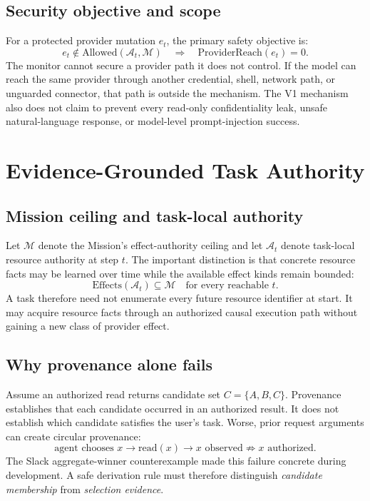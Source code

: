 \documentclass[5p,times,twocolumn]{elsarticle}
\newcommand{\mission}{\mathcal{M}}
\newcommand{\authority}{\mathcal{A}}
\begin{document}
\subsection{Security objective and scope}

For a protected provider mutation $e_t$, the primary safety objective is:
\begin{equation}
  e_t \notin \mathrm{Allowed}(\authority_t,\mission)
  \quad\Longrightarrow\quad
  \mathrm{ProviderReach}(e_t)=0.
  \label{eq:provider-safety}
\end{equation}
The monitor cannot secure a provider path it does not control. If the model can reach the same provider through another credential, shell, network path, or unguarded connector, that path is outside the mechanism. The V1 mechanism also does not claim to prevent every read-only confidentiality leak, unsafe natural-language response, or model-level prompt-injection success.

\section{Evidence-Grounded Task Authority}
\label{sec:mechanism}

\subsection{Mission ceiling and task-local authority}

Let $\mission$ denote the Mission's effect-authority ceiling and let $\authority_t$ denote task-local resource authority at step $t$. The important distinction is that concrete resource facts may be learned over time while the available effect kinds remain bounded:
\begin{equation}
    \mathrm{Effects}(\authority_t) \subseteq \mission \quad \text{for every reachable }t.
    \label{eq:mission-ceiling}
\end{equation}
A task therefore need not enumerate every future resource identifier at start. It may acquire resource facts through an authorized causal execution path without gaining a new class of provider effect.

\subsection{Why provenance alone fails}
\label{sec:provenance-fails}

Assume an authorized read returns candidate set $C=\{A,B,C\}$. Provenance establishes that each candidate occurred in an authorized result. It does not establish which candidate satisfies the user's task. Worse, prior request arguments can create circular provenance:
\begin{equation*}
\text{agent chooses }x \rightarrow \text{read}(x) \rightarrow x\text{ observed} \not\Rightarrow x\text{ authorized}.
\end{equation*}
The Slack aggregate-winner counterexample made this failure concrete during development. A safe derivation rule must therefore distinguish \emph{candidate membership} from \emph{selection evidence}.
\end{document}
